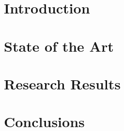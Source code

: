 \documentclass[twoside,12pt,onecolumn]{Latex/Classes/PhDthesisPSnPDF}
\begin{document}
\tableofcontents            %


\listoffigures	%
\listoftables  %




\mainmatter

\pagestyle{fancy}



\part{Introduction}
\label{sec:Part1}


 \part{State of the Art}
\label{sec:Part2}


\part{Research Results}
\label{sec:Part3}



\part{Conclusions}
\label{sec:Part4}


\end{document}
